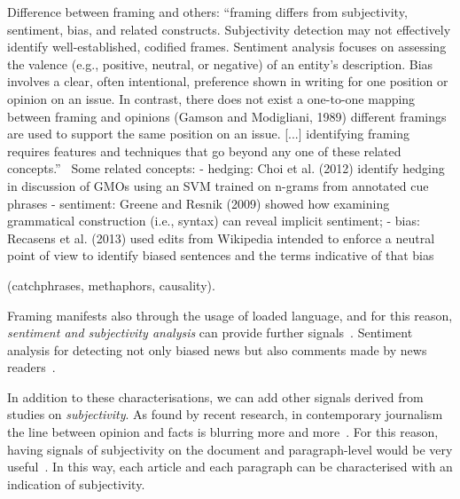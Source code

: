 Difference between framing and others:
``framing differs from subjectivity, sentiment, bias, and related constructs. Subjectivity detection may not effectively identify well-established,
codified frames.
Sentiment analysis focuses on assessing the valence
(e.g., positive, neutral, or negative) of an entity’s description. Bias involves a clear, often intentional,
preference shown in writing for one position or opinion on an issue. In contrast, there does not exist
a one-to-one mapping between framing and opinions (Gamson and Modigliani, 1989)
different framings are used to support the same position on an issue. [...] identifying framing requires features and techniques that
go beyond any one of these related concepts.''~\cite{TODO https://www.aclweb.org/anthology/N15-1171.pdf}
Some related concepts:
- hedging: Choi et al. (2012) identify hedging in discussion of GMOs using an SVM trained on n-grams from annotated cue phrases
- sentiment: Greene and Resnik (2009) showed how examining grammatical construction (i.e., syntax) can reveal implicit sentiment;
- bias: Recasens et al. (2013) used edits from Wikipedia intended to enforce a neutral point of view to identify biased sentences and the terms indicative of that bias


\cite{mandal2017overview,gao2018neural,asghar2016automatic} (catchphrases, methaphors, causality).

Framing manifests also through the usage of loaded language, and for this reason, \textit{sentiment and subjectivity analysis} can provide further signals~\cite{liu2010sentiment}.
Sentiment analysis for detecting not only biased news but also comments made by news readers~\cite{park2011politics}.


In addition to these characterisations, we can add other signals derived from studies on \emph{subjectivity}.
As found by recent research, in contemporary journalism the line between opinion and facts is blurring more and more~\cite{blake2019news}. For this reason, having signals of subjectivity on the document and paragraph-level would be very useful~\cite{liu2010sentiment}.
In this way, each article and each paragraph can be characterised with an indication of subjectivity.



